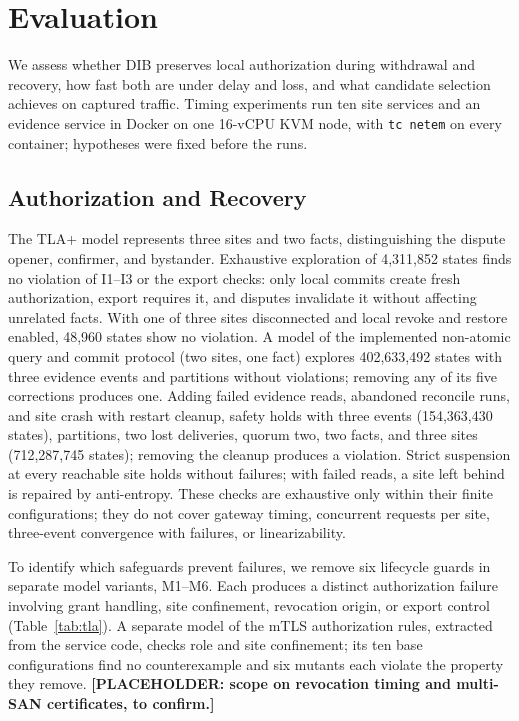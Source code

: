 \section{Evaluation}
\label{sec:eval}
We assess whether DIB preserves local authorization during withdrawal and recovery, how fast both are under delay and loss, and what candidate selection achieves on captured traffic. Timing experiments run ten site services and an evidence service in Docker on one 16-vCPU KVM node, with \texttt{tc netem} on every container; hypotheses were fixed before the runs.

\subsection{Authorization and Recovery}
\label{sec:lifecycle-results}
The TLA+ model represents three sites and two facts, distinguishing the dispute opener, confirmer, and bystander. Exhaustive exploration of 4,311,852 states finds no violation of I1--I3 or the export checks: only local commits create fresh authorization, export requires it, and disputes invalidate it without affecting unrelated facts. With one of three sites disconnected and local revoke and restore enabled, 48,960 states show no violation. A model of the implemented non-atomic query and commit protocol (two sites, one fact) explores 402,633,492 states with three evidence events and partitions without violations; removing any of its five corrections produces one. Adding failed evidence reads, abandoned reconcile runs, and site crash with restart cleanup, safety holds with three events (154,363,430 states), partitions, two lost deliveries, quorum two, two facts, and three sites (712,287,745 states); removing the cleanup produces a violation. Strict suspension at every reachable site holds without failures; with failed reads, a site left behind is repaired by anti-entropy. These checks are exhaustive only within their finite configurations; they do not cover gateway timing, concurrent requests per site, three-event convergence with failures, or linearizability.

To identify which safeguards prevent failures, we remove six lifecycle guards in separate model variants, M1--M6. Each produces a distinct authorization failure involving grant handling, site confinement, revocation origin, or export control (Table~\ref{tab:tla}). A separate model of the mTLS authorization rules, extracted from the service code, checks role and site confinement; its ten base configurations find no counterexample and six mutants each violate the property they remove. \textbf{[PLACEHOLDER: scope on revocation timing and multi-SAN certificates, to confirm.]}

